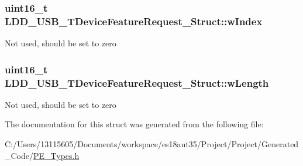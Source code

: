 \subsubsection[{w\+Index}]{\setlength{\rightskip}{0pt plus 5cm}uint16\+\_\+t L\+D\+D\+\_\+\+U\+S\+B\+\_\+\+T\+Device\+Feature\+Request\+\_\+\+Struct\+::w\+Index}\label{struct_l_d_d___u_s_b___t_device_feature_request___struct_a261267b70741fe26898665df42fec10b}
Not used, should be set to zero \hypertarget{struct_l_d_d___u_s_b___t_device_feature_request___struct_af0c222aa4585a132b2582fb1c290edc7}{}
\subsubsection[{w\+Length}]{\setlength{\rightskip}{0pt plus 5cm}uint16\+\_\+t L\+D\+D\+\_\+\+U\+S\+B\+\_\+\+T\+Device\+Feature\+Request\+\_\+\+Struct\+::w\+Length}\label{struct_l_d_d___u_s_b___t_device_feature_request___struct_af0c222aa4585a132b2582fb1c290edc7}
Not used, should be set to zero 

The documentation for this struct was generated from the following file\+:\begin{DoxyCompactItemize}
\item 
C\+:/\+Users/13115605/\+Documents/workspace/es18aut35/\+Project/\+Project/\+Generated\+\_\+\+Code/\hyperlink{_p_e___types_8h}{P\+E\+\_\+\+Types.\+h}\end{DoxyCompactItemize}
